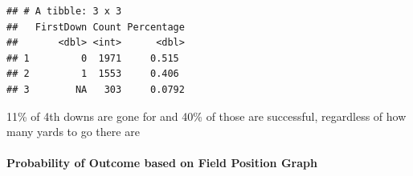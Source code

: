 \documentclass[]{article}
\newenvironment{Shaded}{\begin{snugshade}}{\end{snugshade}}
\newcommand{\KeywordTok}[1]{\textcolor[rgb]{0.13,0.29,0.53}{\textbf{#1}}}
\newcommand{\NormalTok}[1]{#1}
\newcommand{\OperatorTok}[1]{\textcolor[rgb]{0.81,0.36,0.00}{\textbf{#1}}}
\newcommand{\StringTok}[1]{\textcolor[rgb]{0.31,0.60,0.02}{#1}}
\let\oldparagraph\paragraph
\renewcommand{\paragraph}[1]{\oldparagraph{#1}\mbox{}}
\begin{document}
\begin{verbatim}
## # A tibble: 3 x 3
##   FirstDown Count Percentage
##       <dbl> <int>      <dbl>
## 1         0  1971     0.515 
## 2         1  1553     0.406 
## 3        NA   303     0.0792
\end{verbatim}

11\% of 4th downs are gone for and 40\% of those are successful,
regardless of how many yards to go there are

\hypertarget{probability-of-outcome-based-on-field-position-graph}{%
\paragraph{Probability of Outcome based on Field Position
Graph}\label{probability-of-outcome-based-on-field-position-graph}}

\begin{Shaded}
\end{Shaded}
\end{document}
